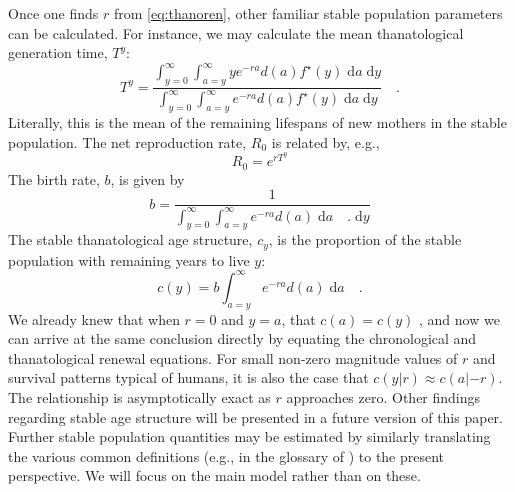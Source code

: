 \documentclass{article}
\newcommand{\dd}{\; \mathrm{d}}
\begin{document}
Once one finds $r$ from \eqref{eq:thanoren}, other familiar stable population
parameters can be calculated. For instance, we may calculate the mean
thanatological generation time, $T^y$:
\begin{equation}
\label{eq:Ty}
 T^y =  \frac{\int _{y=0}^\infty \int _{a=y}^\infty y e^{-ra} d(a) f^\star(y) \dd a
\dd y}{\int _{y=0}^\infty \int _{a=y}^\infty e^{-ra} d(a) f^\star(y) \dd a \dd
y} \quad \text{.}
\end{equation}
Literally, this is the mean of the remaining lifespans of new mothers in the
stable population. The net reproduction rate, $R_0$ is related by, e.g.,
\begin{equation}
\label{eq:R0fromTy}
R_0 = e^{r T^y}
\end{equation}
The birth rate, $b$, is given by
\begin{equation}
\label{eq:eybrate}
b = \frac{1}{\int _{y=0}^\infty \int _{a=y}^\infty e^{-ra} d(a) \dd a
\quad\text{.} \dd y}
\end{equation}
The stable thanatological age structure, $c_y$, is the
proportion of the stable population with remaining years to live $y$:
\begin{equation}
\label{eq:cy}
c(y) = b \int _{a=y}^\infty e^{-ra} d(a) \dd a \quad\text{.}
\end{equation}
We already knew that when $r = 0$ and $y = a$, that $c(a)=c(y)$
\citep{vaupel2009life}, and now we can arrive at the same conclusion directly
by equating the chronological and thanatological renewal equations. For
small non-zero magnitude values of $r$ and survival patterns typical of humans, it is also the
case that $c(y|r)\approx c(a|-r)$. The relationship is asymptotically exact as
$r$ approaches zero. Other findings regarding stable age structure will be
presented in a future version of this paper. Further stable population
quantities may be estimated by similarly translating the various common definitions (e.g.,
in the glossary of \citet{coale1972growth}) to the present perspective. We will
focus on the main model rather than on these.
\end{document}
